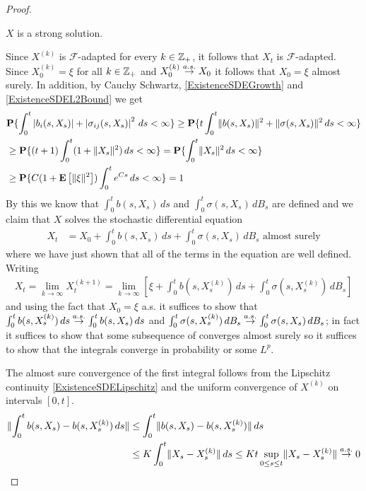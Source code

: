\begin{proof}
\begin{clm}$X$ is a strong solution.
\end{clm}

Since $X^{(k)}$ is $\mathcal{F}$-adapted for every $k \in \mathbb{Z}_+$,  it follows that $X_t$ is $\mathcal{F}$-adapted.  Since $X^{(k)}_0 = \xi$ for all $k \in \mathbb{Z}_+$ and $X^{(k)}_0 \overset{a.s.}\to X_0$ it follows that $X_0 = \xi$ almost surely.  In addition, by Cauchy Schwartz, \eqref{ExistenceSDEGrowth} and \eqref{ExistenceSDEL2Bound} we get
\begin{align*}
&\textbf{P}\{\int_0^t \left \vert b_i(s, X_s) \right \vert + \left \vert \sigma_{ij}(s, X_s) \right \vert^2 \, ds < \infty\} 
\geq \textbf{P}\{t\int_0^t \lVert b(s, X_s) \rVert^2 + \lVert \sigma(s, X_s) \rVert^2 \, ds < \infty\} \\
&\geq \textbf{P}\{(t+1)\int_0^t (1+\lVert X_s \rVert^2) \, ds < \infty\} = \textbf{P}\{\int_0^t \lVert X_s \rVert^2 \, ds < \infty\} \\
&\geq \textbf{P}\{ C(1 + \textbf{E}\left[\lVert \xi \rVert^2\right]) \int_0^t e^{Cs} \, ds < \infty\} = 1
\end{align*}
By this we know that $\int_0^t b(s,X_s) \, ds$ and $\int_0^t \sigma(s, X_s) \, dB_s$ are defined and we claim that $X$ solves the stochastic differential equation
\begin{align*}
X_t &= X_0 + \int_0^t b(s,X_s) \, ds + \int_0^t \sigma(s,X_s) \, dB_s \text{ almost surely}
\end{align*}
where we have just shown that all of the terms in the equation are well defined.   Writing
\begin{align*}
X_t = \lim_{k \to \infty} X^{(k+1)}_t = \lim_{k \to \infty} \left[ \xi + \int_0^t b(s,X^{(k)}_s) \, ds + \int_0^t \sigma(s,X^{(k)}_s) \, dB_s \right]
\end{align*}
and using the fact that $X_0 = \xi$ a.s. it suffices to show that $\int_0^t b(s,X^{(k)}_s) \, ds \overset{a.s.}\to \int_0^t b(s,X_s) \, ds$ and $\int_0^t \sigma(s,X^{(k)}_s) \, dB_s \overset{a.s.}\to \int_0^t \sigma(s,X_s) \, dB_s$; in fact it suffices to show that some subsequence of converges almost surely so it suffices to show that the integrals converge in probability or some $L^p$.

The almost sure convergence of the first integral follows from the Lipschitz continuity \eqref{ExistenceSDELipschitz} and the uniform convergence of $X^{(k)}$ on intervals $[0,t]$.
\begin{align*}
\lVert \int_0^t b(s,X_s) - b(s,X^{(k)}_s) \, ds \rVert &\leq \int_0^t \lVert  b(s,X_s) - b(s,X^{(k)}_s) \rVert \, ds \\
&\leq K \int_0^t \lVert  X_s - X^{(k)}_s \rVert \, ds \leq K t \sup_{0 \leq s \leq t} \lVert  X_s - X^{(k)}_s \rVert \overset{a.s.}\to 0
\end{align*}


\end{proof}
